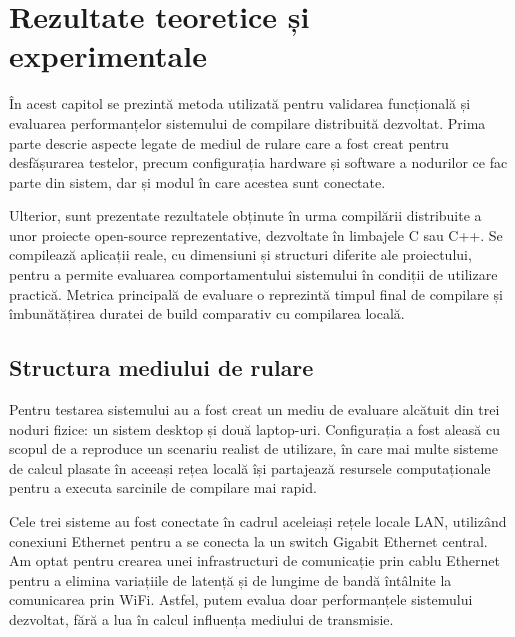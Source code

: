 
\chapter{Rezultate teoretice și experimentale}
\label{cap:rezultate}




În acest capitol se prezintă metoda utilizată pentru validarea funcțională și evaluarea performanțelor sistemului de compilare distribuită
dezvoltat. Prima parte descrie aspecte legate de mediul de rulare care a fost creat pentru desfășurarea testelor, precum 
configurația hardware și software a nodurilor ce fac parte din sistem, dar și modul în care acestea sunt conectate.

Ulterior, sunt prezentate rezultatele obținute în urma compilării distribuite  a unor proiecte open-source reprezentative, dezvoltate
în limbajele C sau C++. Se compilează aplicații reale, cu dimensiuni și structuri diferite ale proiectului, pentru a permite evaluarea
comportamentului sistemului în condiții de utilizare practică. Metrica principală de evaluare o reprezintă timpul final de compilare și
îmbunătățirea duratei de build comparativ cu compilarea locală.

\section{Structura mediului de rulare}

Pentru testarea sistemului au a fost creat un mediu de evaluare alcătuit din trei noduri fizice: un sistem desktop și două
laptop-uri. Configurația a fost aleasă cu scopul de a reproduce un scenariu realist de utilizare, în care mai multe sisteme de calcul 
plasate în aceeași rețea locală își partajează resursele computaționale pentru a executa sarcinile de compilare mai rapid.

Cele trei sisteme au fost conectate în cadrul aceleiași rețele locale LAN, utilizând conexiuni Ethernet pentru a se conecta la
un switch Gigabit Ethernet central. Am optat pentru crearea unei infrastructuri de comunicație prin cablu Ethernet pentru a elimina
variațiile de latență și de lungime de bandă întâlnite la comunicarea prin WiFi. Astfel, putem evalua doar performanțele sistemului
dezvoltat, fără a lua în calcul influența mediului de transmisie.

